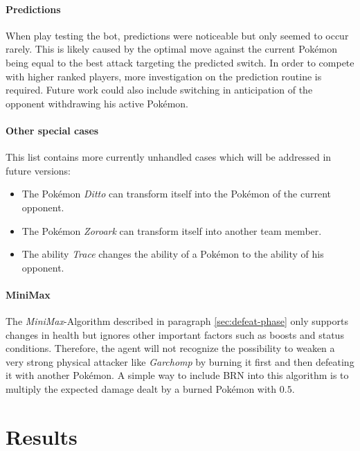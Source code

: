 \paragraph{Predictions}
\label{par:predictions}
When play testing the bot, predictions were noticeable but only seemed to occur rarely. This is 
likely caused by the optimal move against the current Pokémon being equal to the best attack
targeting the predicted switch. In order to compete with higher ranked players, more investigation
on the prediction routine is required. Future work could also include switching in anticipation
of the opponent withdrawing his active Pokémon.

\paragraph{Other special cases}
This list contains more currently unhandled cases which will be addressed in future versions:
\begin{itemize}
  \item The Pokémon \textit{Ditto} can transform itself into the Pokémon of the current opponent.
  \item The Pokémon \textit{Zoroark} can transform itself into another team member. 
  \item The ability \textit{Trace} changes the ability of a Pokémon to the ability of his opponent.
\end{itemize}

\paragraph{MiniMax}
The \textit{MiniMax}-Algorithm described in paragraph \ref{sec:defeat-phase} only supports changes in health
but ignores other important factors such as boosts and status conditions. Therefore, the agent will 
not recognize the possibility to weaken a very strong physical attacker like \textit{Garchomp} by burning
it first and then defeating it with another Pokémon. A simple way to include \ac{BRN} into this algorithm
is to multiply the expected damage dealt by a burned Pokémon with $0.5$. 

\section{Results}
